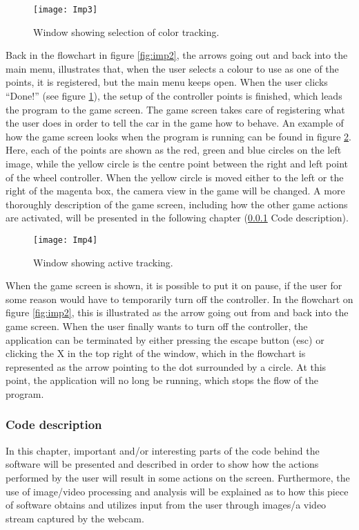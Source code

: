 \begin{figure}[!htbp]
\centering
\texttt{[image: Imp3]}
\caption{Window showing selection of color tracking.} 
\label{fig:imp3}
\end{figure}

Back in the flowchart in figure \ref{fig:imp2}, the arrows going out and back into the main menu, illustrates that, when the user selects a colour to use as one of the points, it is registered, but the main menu keeps open. 
When the user clicks “Done!” (see figure \ref{fig:imp3}), the setup of the controller points is finished, which leads the program to the game screen. 
The game screen takes care of registering what the user does in order to tell the car in the game how to behave. 
An example of how the game screen looks when the program is running can be found in figure \ref{fig:imp4}. 
Here, each of the points are shown as the red, green and blue circles on the left image, while the yellow circle is the centre point between the right and left point of the wheel controller. When the yellow circle is moved either to the left or the right of the magenta box, the camera view in the game will be changed. 
A more thoroughly description of the game screen, including how the other game actions are activated, will be presented in the following chapter (\ref{sec:codedesc} Code description).
\bigskip

\begin{figure}[!htbp]
\centering
\texttt{[image: Imp4]}
\caption{Window showing active tracking.} 
\label{fig:imp4}
\end{figure}

When the game screen is shown, it is possible to put it on pause, if the user for some reason would have to temporarily turn off the controller. 
In the flowchart on figure \ref{fig:imp2}, this is illustrated as the arrow going out from and back into the game screen. 
When the user finally wants to turn off the controller, the application can be terminated by either pressing the escape button (esc) or clicking the X in the top right of the window, which in the flowchart is represented as the arrow pointing to the dot surrounded by a circle. 
At this point, the application will no long be running, which stops the flow of the program.

\subsubsection{Code description} \label{sec:codedesc}
In this chapter, important and/or interesting parts of the code behind the software will be presented and described in order to show how the actions performed by the user will result in some actions on the screen. 
Furthermore, the use of image/video processing and analysis will be explained as to how this piece of software obtains and utilizes input from the user through images/a video stream captured by the webcam.

